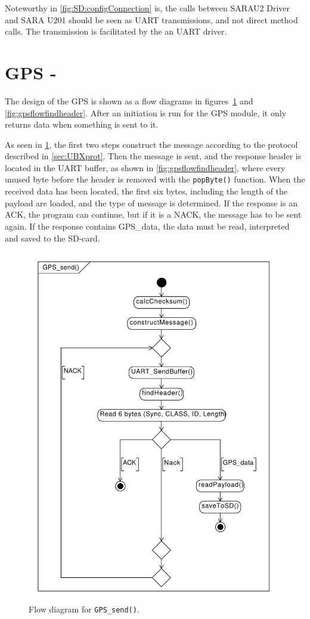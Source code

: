 Noteworthy in \cref{fig:SD:configConnection} is, the calls between SARAU2 Driver and SARA U201 should be seen as UART transmissions, and not direct method calls. The transmission is facilitated by the an UART driver. 

\section{GPS - \GPS}
The design of the GPS is shown as a flow diagrams in figures~\ref{fig:gpsflowsend} and \ref{fig:gpsflowfindheader}.
After an initiation is run for the GPS module, it only returns data when something is sent to it.

As seen in \cref{fig:gpsflowsend}, the first two steps construct the message according to the protocol described in \cref{sec:UBXprot}.
Then the message is sent, and the response header is located in the UART buffer, as shown in \cref{fig:gpsflowfindheader}, where every unused byte before the header is removed with the \texttt{popByte()} function.
When the received data has been located, the first six bytes, including the length of the payload are loaded, and the type of message is determined.
If the response is an ACK, the program can continue, but if it is a NACK, the message has to be sent again.
If the response contains GPS\_data, the data must be read, interpreted and saved to the SD-card.

\begin{figure}
	\centering
	\includegraphics[width=0.7\linewidth]{gfx/Design/GPSFlowSend.pdf}
	\caption{Flow diagram for \texttt{GPS_send()}.}
	\label{fig:gpsflowsend}
\end{figure}

